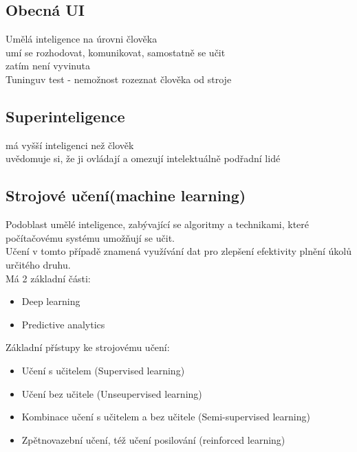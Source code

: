 \subsection{Obecná UI}
Umělá inteligence na úrovni člověka\\
umí se rozhodovat, komunikovat, samostatně se učit\\
zatím není vyvinuta\\
Tuninguv test - nemožnost rozeznat člověka od stroje\\

\subsection*{Superinteligence}
má vyšší inteligenci než člověk\\
uvědomuje si, že ji ovládají a omezují intelektuálně podřadní lidé\\



\subsection{Strojové učení(machine learning)}
Podoblast umělé inteligence, zabývající se algoritmy a technikami, které počítačovému systému umožňují se učit.\\
Učení v tomto případě znamená využívání dat pro zlepšení efektivity plnění úkolů určitého druhu.\\
Má 2 základní části:
\begin{itemize}
    \item Deep learning
    \item Predictive analytics
\end{itemize}

Základní přístupy ke strojovému učení:
\begin{itemize}
    \item Učení s učitelem (Supervised learning)
    \item Učení bez učitele (Unseupervised learning)
    \item Kombinace učení s učitelem a bez učitele (Semi-supervised learning)
    \item Zpětnovazební učení, též učení posilování (reinforced learning)
\end{itemize}

